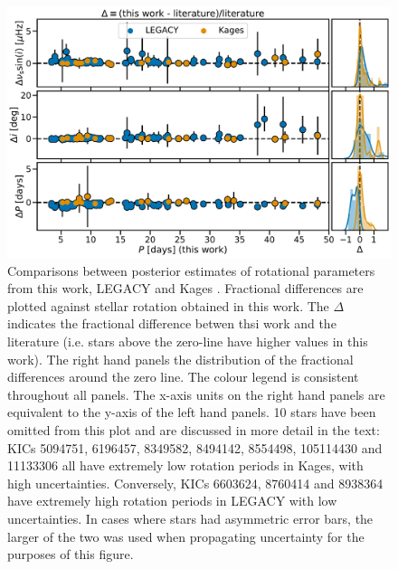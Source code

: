 \begin{figure}
	\centering
	\includegraphics[width=\textwidth]{Images/litcomp_alt2.pdf}
	\caption{Comparisons between posterior estimates of rotational parameters from this work, LEGACY and Kages \cite[private communication]{davies+2016, lund+2017}. Fractional differences are plotted against stellar rotation obtained in this work. The $\Delta$ indicates the fractional difference betwen thsi work and the literature (i.e. stars above the zero-line have higher values in this work). The right hand panels the distribution of the fractional differences around the zero line. The colour legend is consistent throughout all panels. The x-axis units on the right hand panels are equivalent to the y-axis of the left hand panels. 10 stars have been omitted from this plot and are discussed in more detail in the text: KICs 5094751, 6196457, 8349582, 8494142, 8554498, 105114430 and 11133306 all have extremely low rotation periods in Kages, with high uncertainties. Conversely, KICs 6603624, 8760414 and 8938364 have extremely high rotation periods in LEGACY with low uncertainties. In cases where stars had asymmetric error bars, the larger of the two was used when propagating uncertainty for the purposes of this figure.}
	\label{fig:legacykages}
\end{figure}
 
